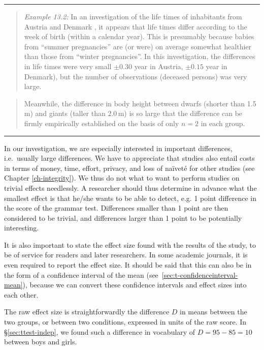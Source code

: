 \documentclass[
]{book}
\begin{document}
\begin{center}\rule{0.5\linewidth}{0.5pt}\end{center}

\begin{quote}
\emph{Example 13.2:}
In an investigation of the life times of inhabitants from Austria
and Denmark \citep{Dobl99}, it appears that life times differ according to
the week of birth (within a calendar year). This is presumably because babies from ``summer pregnancies''
are (or were) on average somewhat healthier than those
from ``winter pregnancies''. In this investigation, the differences
in life times were very small \(\pm 0.30\) year in Austria, \(\pm 0.15\) year
in Denmark), but the number of observations (deceased persons) was very large.
\end{quote}

\begin{quote}
Meanwhile, the difference in body height between dwarfs (shorter than
1.5 m) and giants (taller than 2.0 m) is so large that the difference can be firmly
empirically established on the basis of only \(n=2\) in each group.
\end{quote}

\begin{center}\rule{0.5\linewidth}{0.5pt}\end{center}

In our investigation, we are especially interested in important
differences, i.e.~usually large differences. We have to appreciate
that studies also entail costs in terms of money, time,
effort, privacy, and loss of naïveté for other studies
(see Chapter
\ref{ch-integrity}). We thus do not what to want to perform studies
on trivial effects needlessly. A researcher should thus determine in advance
what the smallest effect is that he/she wants to be able to detect, e.g.
1 point difference in the score of the grammar test. Differences smaller than
1 point are then considered to be trivial, and differences larger than 1 point to be potentially
interesting.

It is also important to state the effect size found with the results
of the study, to be of service for readers and later
researchers. In some academic journals, it is even
required to report the effect size. It should be said that this
can also be in the form of a confidence interval of the mean
(see~\ref{sec:t-confidenceinterval-mean}), because we can
convert these confidence intervals and effect sizes into
each other.

The raw effect size is straightforwardly the difference \(D\) in means
between the two groups, or between two conditions, expressed in units
of the raw score. In §\ref{sec:ttest-indep}, we found such a difference
in vocabulary of \(D=95-85=10\) between boys and girls.
\end{document}
